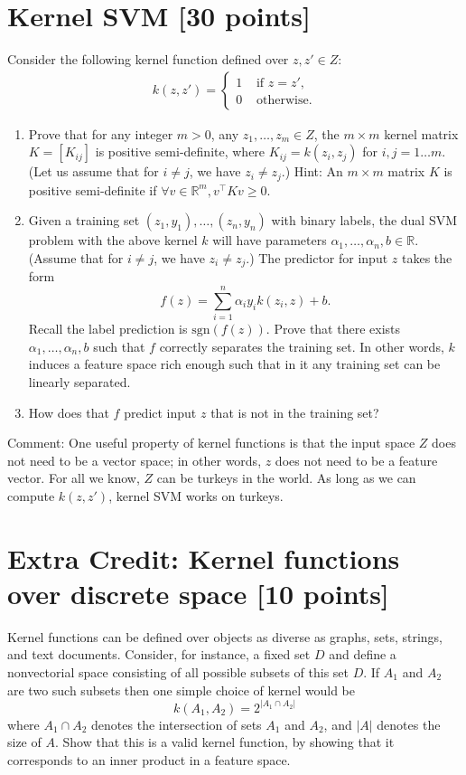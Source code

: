 \documentclass[a4paper]{article}
\theoremstyle{definition}
\newcommand{\sgn}{\mathrm{sgn}}
\def\R{\mathbb R}
\begin{document}
\section{Kernel SVM [30 points]}
Consider the following kernel function defined over $z,z'\in Z$:
\begin{align*}
k(z,z') =
\begin{cases}
1 & \text{~if~} z=z', \\
0 & \text{~otherwise.}
\end{cases}
\end{align*}
\begin{enumerate}
\item Prove that for any integer $m>0$, any $z_1, \ldots, z_m \in Z$, the $m \times m$ kernel matrix $K=[K_{ij}]$ is positive semi-definite, where $K_{ij}=k(z_i, z_j)$ for $i,j=1\ldots m$. (Let us assume that for $i \neq j$, we have $z_i \neq z_j$.)
Hint: An $m\times m$ matrix $K$ is positive semi-definite if $\forall v \in \R^m, v^\top K v \ge 0$.

\item Given a training set $(z_1, y_1), \ldots, (z_n, y_n)$ with binary labels, the dual SVM problem with the above kernel $k$ will have parameters $\alpha_1, \ldots, \alpha_n, b \in \R$.  (Assume that for $i \neq j$, we have $z_i \neq z_j$.) The predictor for input $z$ takes the form
$$f(z) = \sum_{i=1}^n \alpha_i y_i k(z_i, z) + b.$$
Recall the label prediction is $\sgn(f(z))$.
Prove that there exists $\alpha_1, \ldots, \alpha_n, b$ such that $f$ correctly separates the training set.
In other words, $k$ induces a feature space rich enough such that in it any training set can be linearly separated.

\item How does that $f$ predict input $z$ that is not in the training set?

\end{enumerate}

Comment: One useful property of kernel functions is that the input space $Z$ does not need to be a vector space; in other words, $z$ does not need to be a feature vector.  For all we know, $Z$ can be turkeys in the world.  As long as we can compute $k(z,z')$, kernel SVM works on turkeys.
 
\section{Extra Credit: Kernel functions over discrete space [10 points]}
Kernel functions can be defined over objects as diverse as graphs, sets, strings, and text documents.
Consider, for instance, a fixed set $D$ and define a nonvectorial space consisting
of all possible subsets of this set $D$. If $A_1$ and $A_2$ are two such subsets then one simple
choice of kernel would be
$$
k(A_1, A_2) = 2^{|A_1 \cap A_2|}
$$
where $A_1 \cap A_2$ denotes the intersection of sets $A_1$ and $A_2$, and $|A|$ denotes the
size of $A$. Show that this is a valid kernel function, by showing that it corresponds to an inner product in a feature space.
\end{document}
